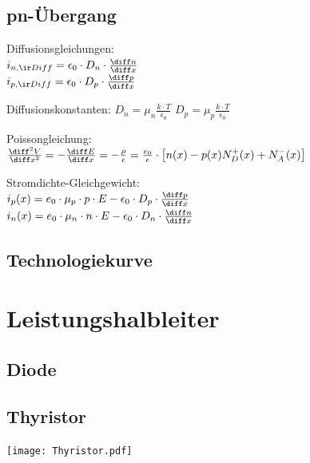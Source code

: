 \documentclass[fs, german]{latex4ei_fs}
\begin{document}
\begin{sectionbox}

\subsection{pn-Übergang}

Diffusionsgleichungen: \\
$i_{n, \ir Diff} = \epsilon_0 \cdot D_n \cdot \frac{\diff n}{\diff x}$\\
$i_{p, \ir Diff} = \epsilon_0 \cdot D_p \cdot \frac{\diff p}{\diff x}$

Diffusionskonstanten: 
$D_n = \mu_n \frac{k \cdot T}{\epsilon_0}$ \quad $D_p = \mu_p \frac{k \cdot T}{\epsilon_0}$

Poissongleichung: \\
 $\frac{\diff^2 V}{\diff x^2} = - \frac{\diff E}{\diff x} = - \frac{\rho}{\epsilon} = \frac{e_0}{\epsilon} \cdot \left[ n(x) - p(x)  N_D^+ (x) + N_A^- (x) \right]$

 Stromdichte-Gleichgewicht: \\
 $i_p (x) = e_0 \cdot \mu_p \cdot p \cdot E - \epsilon_0 \cdot D_p \cdot \frac{\diff p}{\diff x}$ \\
  $i_n (x) = e_0 \cdot \mu_n \cdot n \cdot E - \epsilon_0 \cdot D_n \cdot \frac{\diff n}{\diff x}$
\end{sectionbox}

\begin{sectionbox}
\subsection{Technologiekurve}
\end{sectionbox}

\section{Leistungshalbleiter}

\begin{sectionbox}
\subsection{Diode}
\end{sectionbox}

\begin{sectionbox}
\subsection{Thyristor}
\texttt{[image: Thyristor.pdf]}

\end{sectionbox}
\end{document}
